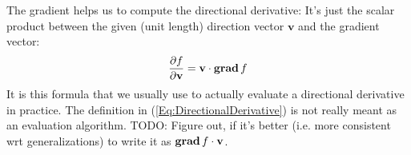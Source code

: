\medskip
The gradient helps us to compute the directional derivative: It's just the scalar product between the given (unit length) direction vector $\mathbf{v}$ and the gradient vector:
\begin{equation}
 \frac{\partial f}{\partial \mathbf{v}} = \mathbf{v} \cdot \operatorname{\mathbf{grad}} f
\end{equation}
It is this formula that we usually use to actually evaluate a directional derivative in practice. The definition in (\ref{Eq:DirectionalDerivative}) is not really meant as an evaluation algorithm. TODO: Figure out, if it's better (i.e. more consistent wrt generalizations) to write it as $\operatorname{\mathbf{grad}} f \cdot \mathbf{v}$.

